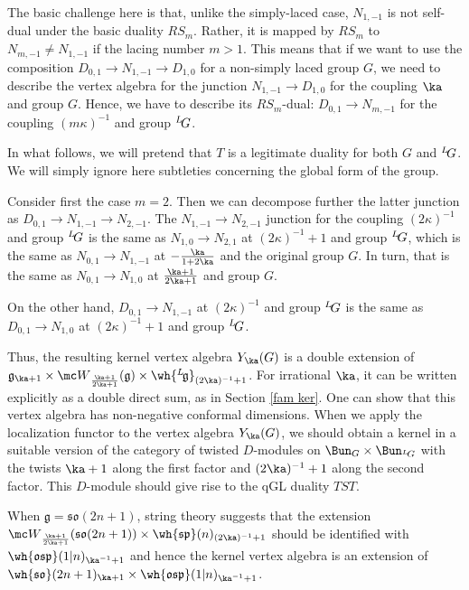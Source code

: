 \documentclass[11pt,reqno]{amsart}
\theoremstyle{plain}
\numberwithin{equation}{section}
\newcommand{\g}{\mathfrak{g}}
\def\neg{\negthinspace}
\def\lg{{}^L\neg\g}
\def\LG{{}^L\neg G}
\theoremstyle{definition}
\begin{document}
The basic challenge here is that, unlike the simply-laced case,
$N_{1,-1}$ is not self-dual under the basic duality $RS_m$. Rather, it
is mapped by $RS_m$ to $N_{m,-1} \neq N_{1,-1}$ if the lacing number
$m>1$. This means that if we want to use the composition $D_{0,1} \to
N_{1,-1} \to D_{1,0}$ for a non-simply laced group $G$, we need to
describe the vertex algebra for the junction $N_{1,-1} \to D_{1,0}$
for the coupling $\ka$ and group $G$. Hence, we have to describe its
$RS_m$-dual: $D_{0,1} \to N_{m,-1}$ for the coupling $(m\kappa)^{-1}$
and group $\LG$. 

In what follows, we will pretend that $T$ is a
legitimate duality for both $G$ and $\LG$.
We will simply ignore here subtleties concerning the global form of the group. 

\bigskip

Consider first the case $m=2$. Then we can decompose further the
latter junction as $D_{0,1} \to N_{1,-1} \to N_{2,-1}$.  The $N_{1,-1}
\to N_{2,-1}$ junction for the coupling $(2\kappa)^{-1}$ and group
$\LG$ is the same as $N_{1,0} \to N_{2,1}$ at $(2\kappa)^{-1}+1$ and
group $\LG$, which is the same as $N_{0,1} \to N_{1,-1}$ at
$-\frac{\ka}{1+2\ka}$ and the original group $G$. In turn, that is the
same as $N_{0,1} \to N_{1,0}$ at $\frac{\ka+1}{2\ka+1}$ and group $G$.

On the other hand, $D_{0,1} \to N_{1,-1}$ at $(2\kappa)^{-1}$ and
group $\LG$ is the same as $D_{0,1} \to N_{1,0}$ at $(2\kappa)^{-1}+1$
and group $\LG$.

Thus, the resulting kernel vertex algebra $Y_\ka(G)$ is a double
extension of $\mathfrak{g}_{\ka+1} \times {\mc
  W}_{\frac{\ka+1}{2\ka+1}}(\g) \times
\wh{\lg}_{(2\ka)^{-1}+1}$. For irrational $\ka$, it can be written
explicitly as a double direct sum, as in Section \ref{fam ker}. One
can show that this vertex algebra has non-negative conformal
dimensions. When we apply the localization functor to the vertex
algebra $Y_\ka(G)$, we should obtain a kernel in a suitable version of
the category of twisted $D$-modules on $\Bun_G \times \Bun_{\LG}$ with
the twists $\ka+1$ along the first factor and $(2\ka)^{-1}+1$ along
the second factor. This $D$-module should give rise to the qGL duality
$T S T$.

When $\mathfrak{g} = \mathfrak{so}(2n+1)$, string theory suggests that
the extension ${\mc W}_{\frac{\ka+1}{2\ka+1}}(\mathfrak{so}(2n+1))
\times \wh{\mathfrak{sp}}(n)_{(2\ka)^{-1}+1}$ should be identified
with $\wh{\mathfrak{osp}}(1|n)_{\ka^{-1}+1}$ and hence the kernel
vertex algebra is an extension of $\wh{\mathfrak{so}}(2n+1)_{\ka+1}
\times \wh{\mathfrak{osp}}(1|n)_{\ka^{-1}+1}$.
\end{document}
